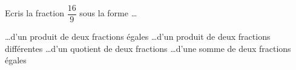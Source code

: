 %
%
Ecris la fraction $\dfrac{16}{9}$ sous la forme \dots\\
  \begin{tasks}
    \task \dots d'un produit de deux fractions égales
    \task \dots d'un produit de deux fractions différentes
    \task \dots d'un quotient de deux fractions
    \task \dots d'une somme de deux fractions égales
  \end{tasks}
